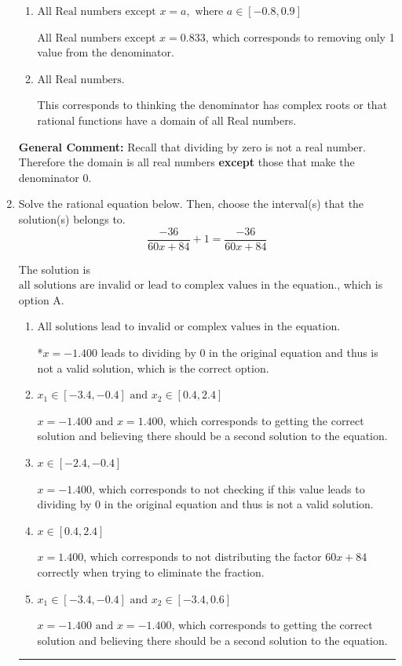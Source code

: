 \documentclass{extbook}[14pt]
\newcommand{\litem}[1]{\item #1

\rule{\textwidth}{0.4pt}}
\begin{document}
\begin{enumerate}
{\begin{enumerate}[label=\Alph*.]
All Real numbers except $x = 24.000$ and $x = 30.000$, which corresponds to not factoring the denominator correctly.
\item \( \text{All Real numbers except } x = a, \text{ where } a \in [-0.8, 0.9] \)

All Real numbers except $x = 0.833$, which corresponds to removing only 1 value from the denominator.
\item \( \text{All Real numbers.} \)

This corresponds to thinking the denominator has complex roots or that rational functions have a domain of all Real numbers.
\end{enumerate}

\textbf{General Comment:} Recall that dividing by zero is not a real number. Therefore the domain is all real numbers \textbf{except} those that make the denominator 0.
}
\litem{
Solve the rational equation below. Then, choose the interval(s) that the solution(s) belongs to.
\[ \frac{-36}{60x + 84} + 1 = \frac{-36}{60x + 84} \]

The solution is \( \text{all solutions are invalid or lead to complex values in the equation.} \), which is option A.\begin{enumerate}[label=\Alph*.]
\item \( \text{All solutions lead to invalid or complex values in the equation.} \)

*$x = -1.400$ leads to dividing by 0 in the original equation and thus is not a valid solution, which is the correct option.
\item \( x_1 \in [-3.4, -0.4] \text{ and } x_2 \in [0.4,2.4] \)

$x = -1.400 \text{ and } x = 1.400$, which corresponds to getting the correct solution and believing there should be a second solution to the equation.
\item \( x \in [-2.4,-0.4] \)

$x = -1.400$, which corresponds to not checking if this value leads to dividing by 0 in the original equation and thus is not a valid solution.
\item \( x \in [0.4,2.4] \)

$x = 1.400$, which corresponds to not distributing the factor $60x + 84$ correctly when trying to eliminate the fraction.
\item \( x_1 \in [-3.4, -0.4] \text{ and } x_2 \in [-3.4,0.6] \)

$x = -1.400 \text{ and } x = -1.400$, which corresponds to getting the correct solution and believing there should be a second solution to the equation.
\end{enumerate}

}
\end{enumerate}
\end{document}
